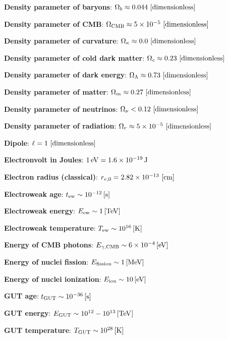 \documentclass[a4paper,11pt]{article}
\begin{document}
{\noindent}\textbf{Density parameter of baryons}: $\Omega_b \approx 0.044 ~ [{\rm dimensionless}]$

{\noindent}\textbf{Density parameter of CMB}: $\Omega_\mathrm{CMB} \approx 5\times10^{-5} ~ [{\rm dimensionless}]$

{\noindent}\textbf{Density parameter of curvature}: $\Omega_\kappa \approx 0.0 ~ [{\rm dimensionless}]$

{\noindent}\textbf{Density parameter of cold dark matter}: $\Omega_c \approx 0.23 ~ [{\rm dimensionless}]$

{\noindent}\textbf{Density parameter of dark energy}: $\Omega_\Lambda \approx 0.73 ~ [{\rm dimensionless}]$

{\noindent}\textbf{Density parameter of matter}: $\Omega_m \approx 0.27 ~ [{\rm dimensionless}]$

{\noindent}\textbf{Density parameter of neutrinos}: $\Omega_\nu < 0.12 ~ [{\rm dimensionless}]$

{\noindent}\textbf{Density parameter of radiation}: $\Omega_r \approx 5\times10^{-5} ~ [{\rm dimensionless}]$

{\noindent}\textbf{Dipole}: $\ell=1 ~ [{\rm dimensionless}]$

{\noindent}\textbf{Electronvolt in Joules}: $1\,{\rm eV} = 1.6\times10^{-19}\,{\rm J}$

{\noindent}\textbf{Electron radius (classical)}: $r_{e,0}=2.82\times10^{-13} ~ [{\rm cm}]$

{\noindent}\textbf{Electroweak age}: $t_\mathrm{ew} \sim 10^{-12}\,[{\rm s}]$

{\noindent}\textbf{Electroweak energy}: $E_\mathrm{ew} \sim 1\,[{\rm TeV}]$

{\noindent}\textbf{Electroweak temperature}: $T_\mathrm{ew} \sim 10^{16}\,[{\rm K}]$

{\noindent}\textbf{Energy of CMB photons}: $E_{\gamma,\mathrm{CMB}} \sim 6\times10^{-4}\,[{\rm eV}]$

{\noindent}\textbf{Energy of nuclei fission}: $E_\mathrm{fission} \sim 1\,[{\rm MeV}]$

{\noindent}\textbf{Energy of nuclei ionization}: $E_\mathrm{ion} \sim 10\,[{\rm eV}]$

{\noindent}\textbf{GUT age}: $t_\mathrm{GUT} \sim 10^{-36}\,[{\rm s}]$

{\noindent}\textbf{GUT energy}: $E_\mathrm{GUT} \sim 10^{12}-10^{13}\,[{\rm TeV}]$

{\noindent}\textbf{GUT temperature}: $T_\mathrm{GUT} \sim 10^{28}\,[{\rm K}]$
\end{document}
